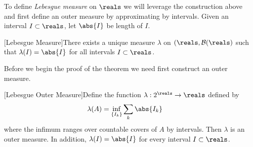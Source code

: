 To define \emph{Lebesgue measure} on $\reals$ we will leverage the
construction above and first define an outer measure by approximating
by intervals.  Given an interval $I \subset \reals$, let $\abs{I}$ be
length of $I$.
\begin{thm}\label{LebesgueMeasure}[Lebesgue Measure]There exists a
  unique measure $\lambda$ on $(\reals, \mathcal{B}(\reals)$ such that
  $\lambda(I) = \abs{I}$ for all intervals $I \subset \reals$.
\end{thm}
Before we begin the proof of the theorem we need first construct an
outer measure.
\begin{lem}\label{LebesgueOuterMeasure}[Lebesgue Outer Measure]Define the function $\lambda : 2^\reals \to \reals$ defined by 
\begin{align*}
\lambda(A) &= \inf_{\{I_k\}} \sum_k \abs{I_k} 
\end{align*}
where the infimum ranges over countable covers of $A$ by intervals.
Then $\lambda$ is
an outer measure.  In addition, $\lambda(I) = \abs{I}$ for every
interval $I \subset \reals$.
\end{lem}
